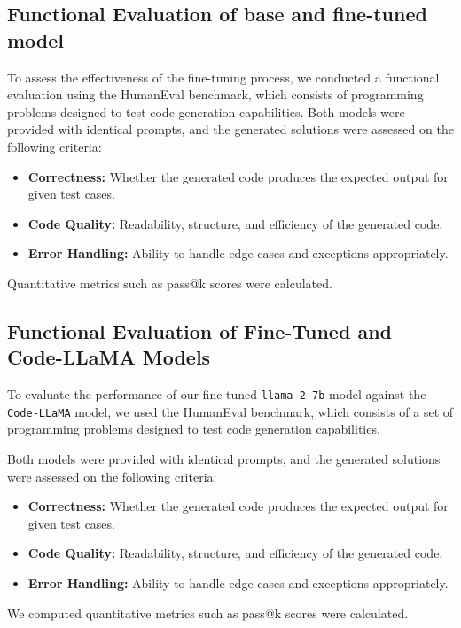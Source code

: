 \subsection{Functional Evaluation of base and fine-tuned model}
To assess the effectiveness of the fine-tuning process, we conducted a functional evaluation using the HumanEval benchmark, which consists of programming problems designed to test code generation capabilities. 
Both models were provided with identical prompts, and the generated solutions were assessed on the following criteria:

\begin{itemize}
    \item \textbf{Correctness:} Whether the generated code produces the expected output for given test cases.
    \item \textbf{Code Quality:} Readability, structure, and efficiency of the generated code.
    \item \textbf{Error Handling:} Ability to handle edge cases and exceptions appropriately.
\end{itemize}
Quantitative metrics such as pass@k scores were calculated.

\subsection{Functional Evaluation of Fine-Tuned and Code-LLaMA Models}
To evaluate the performance of our fine-tuned \texttt{llama-2-7b} model against the \texttt{Code-LLaMA} model, we used the HumanEval benchmark, which consists of a set of programming problems designed to test code generation capabilities.

Both models were provided with identical prompts, and the generated solutions were assessed on the following criteria:

\begin{itemize}
    \item \textbf{Correctness:} Whether the generated code produces the expected output for given test cases.
    \item \textbf{Code Quality:} Readability, structure, and efficiency of the generated code.
    \item \textbf{Error Handling:} Ability to handle edge cases and exceptions appropriately.
\end{itemize}

We computed quantitative metrics such as pass@k scores were calculated.




